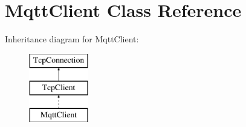 \hypertarget{class_mqtt_client}{}\section{Mqtt\+Client Class Reference}
\label{class_mqtt_client}
Inheritance diagram for Mqtt\+Client\+:\begin{figure}[H]
\begin{center}
\leavevmode
\includegraphics[height=3.000000cm]{class_mqtt_client}
\end{center}
\end{figure}
